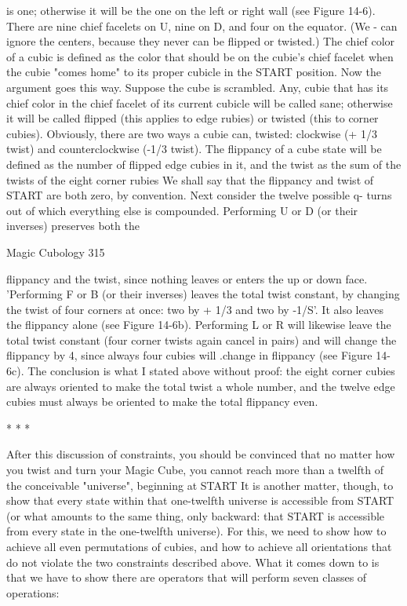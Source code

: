 is one; otherwise it will be the one on the left or right wall (see Figure 14-6). There
are nine chief facelets on U, nine on D, and four on the equator. (We - can ignore the
centers, because they never can be flipped or twisted.) The chief color of a cubic is
defined as the color that should be on the cubie's chief facelet when the cubie "comes
home" to its proper cubicle in the START position.
        Now the argument goes this way. Suppose the cube is scrambled. Any, cubie
that has its chief color in the chief facelet of its current cubicle will be called sane;
otherwise it will be called flipped (this applies to edge rubies) or twisted (this to
corner cubies). Obviously, there are two ways a cubie can, twisted: clockwise (+ 1/3
twist) and counterclockwise (-1/3 twist). The flippancy of a cube state will be defined
as the number of flipped edge cubies in it, and the twist as the sum of the twists of the
eight corner rubies We shall say that the flippancy and twist of START are both zero,
by convention.
        Next consider the twelve possible q- turns out of which everything else is
compounded. Performing U or D (or their inverses) preserves both the


Magic Cubology                                                                       315

flippancy and the twist, since nothing leaves or enters the up or down face.
'Performing F or B (or their inverses) leaves the total twist constant, by changing the
twist of four corners at once: two by + 1/3 and two by -1/S'. It also leaves the
flippancy alone (see Figure 14-6b). Performing L or R will likewise leave the total
twist constant (four corner twists again cancel in pairs) and will change the flippancy
by 4, since always four cubies will .change in flippancy (see Figure 14-6c). The
conclusion is what I stated above without proof: the eight corner cubies are always
oriented to make the total twist a whole number, and the twelve edge cubies must
always be oriented to make the total flippancy even.

                                       *   *   *

       After this discussion of constraints, you should be convinced that no matter
how you twist and turn your Magic Cube, you cannot reach more than a twelfth of the
conceivable "universe", beginning at START It is another matter, though, to show
that every state within that one-twelfth universe is accessible from START (or what
amounts to the same thing, only backward: that START is accessible from every state
in the one-twelfth universe). For this, we need to show how to achieve all even
permutations of cubies, and how to achieve all orientations that do not violate the two
constraints described above. What it comes down to is that we have to show there are
operators that will perform seven classes of operations:

